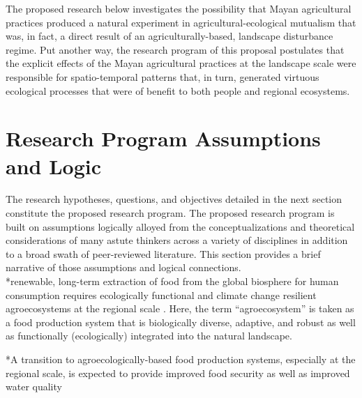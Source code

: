 \documentclass[twoside]{article}	%
\begin{document}
The proposed research below investigates the possibility that Mayan agricultural practices produced a natural experiment in agricultural-ecological mutualism that was, in fact, a direct result of an agriculturally-based, landscape disturbance regime. Put another way, the research program of this proposal postulates that the explicit effects of the Mayan agricultural practices at the landscape scale were responsible for spatio-temporal patterns that, in turn, generated virtuous ecological processes that were of benefit to both people and regional ecosystems.\\ 

\section{Research Program Assumptions and Logic}
The research hypotheses, questions, and objectives detailed in the next section constitute the proposed research program. The proposed research program is built on assumptions logically alloyed from the conceptualizations and theoretical considerations of many astute thinkers across a variety of disciplines in addition to a broad swath of peer-reviewed literature. This section provides a brief narrative of those assumptions and logical connections.\\

*renewable, long-term extraction of food from the global biosphere for human consumption requires ecologically functional and climate change resilient agroecosystems at the regional scale \citep{barnosky_approaching_2012}.  Here, the term \enquote{agroecosystem} is taken as a food production system that is biologically diverse, adaptive, and robust as well as functionally (ecologically) integrated into the natural landscape.
 
 *A transition to agroecologically-based food production systems, especially at the regional scale, is expected to provide improved food security as well as improved water quality \citep{godfray_food_2010, schmidhuber_global_2007} 
\end{document}
